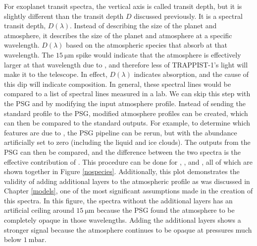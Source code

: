 For exoplanet transit spectra, the vertical axis is called transit depth, but
 it is slightly different than the transit depth $D$ discussed previously. It is
 a spectral transit depth, $D(\lambda)$. Instead of describing the size of the
 planet and atmosphere, it describes the size of the planet and atmosphere at
 a specific wavelength. $D(\lambda)$ based on the atmospheric species
 that absorb at that wavelength. The $\SI{15}{\micro\meter}$ spike would
 indicate that the
 atmosphere is effectively larger at that wavelength due to , and
 therefore less
 of TRAPPIST-1's light will make it to the telescope. In effect, $D(\lambda)$
 indicates absorption, and the cause of this dip will indicate composition.
 In general, these spectral lines would be compared to a list of spectral lines
 measured in a lab. We can skip this step with the PSG and by modifying the
 input atmosphere profile. Instead of sending the standard profile to the PSG,
 modified atmosphere profiles can be created, which can then be compared to the standard
 outputs. For example, to determine which features are due to , the
 PSG pipeline can be rerun, but with the  abundance artificially
 set to zero (including
 the liquid and ice clouds). The outputs from the PSG can then be compared, and
 the difference between the two spectra is the effective contribution of
 . This procedure can be done for , , and
 , all of which are shown together in Figure \ref{nospecies}.
 Additionally, this plot demonstrates the validity of adding additional layers to
 the atmospheric profile as was discussed in Chapter \ref{models}, one of the
 most significant assumptions made in the creation of this
 spectra. In this figure, the spectra without the additional layers has an
 artificial ceiling around $\SI{15}{\micro\meter}$ because the PSG found the atmosphere to be
 completely opaque in those wavelengths. Adding the additional layers shows a
 stronger signal because the atmosphere continues to be opaque at pressures much
 below $\SI{1}{\milli\bar}$.

